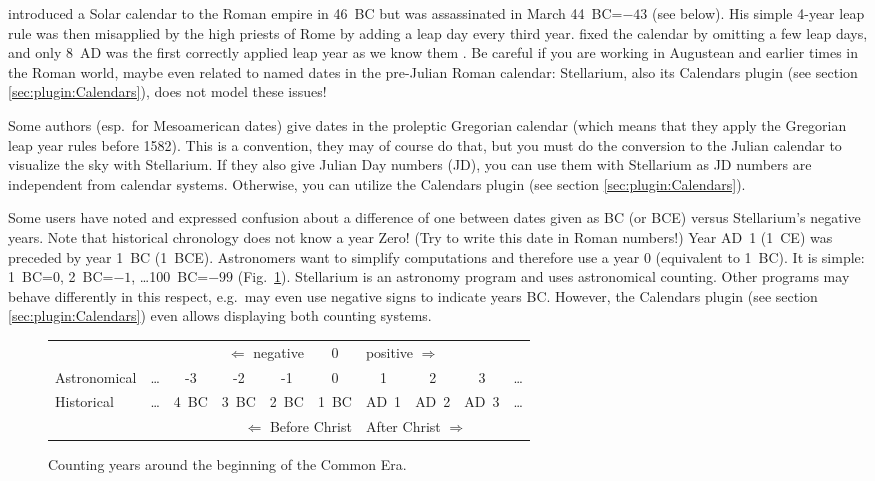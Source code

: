  introduced a Solar calendar to the Roman empire
in 46~BC but was assassinated in March 44~BC=$-43$ (see below).  His
simple 4-year leap rule was then misapplied by the high priests of
Rome by adding a leap day every third year.   fixed the
calendar by omitting a few leap days, and only 8~AD was the first
correctly applied leap year as we know them \citep[\S186,
  \S189]{Ginzel:ChronologieII}. Be careful if you are working in
Augustean and earlier times in the Roman world, maybe even related to
named dates in the pre-Julian Roman calendar: Stellarium, also its
Calendars plugin (see section \ref{sec:plugin:Calendars}), does not
model these issues!


Some authors (esp.\ for Mesoamerican dates) give dates in the
proleptic Gregorian calendar (which means that they apply the Gregorian
leap year rules before 1582). This is a convention, they may of course
do that, but you must do the conversion to the Julian calendar to
visualize the sky with Stellarium.  If they also give Julian Day
numbers (JD), you can use them with Stellarium as JD numbers are
independent from calendar systems. Otherwise, you can utilize the Calendars
plugin (see section \ref{sec:plugin:Calendars}).

Some users have noted and expressed confusion about a difference of one between dates given as BC (or BCE) versus
Stellarium's negative years.  
Note that historical chronology does not know a year Zero! (Try to write this date in Roman numbers!)  
Year AD~1 (1~CE) was preceded by year 1~BC (1~BCE). 
Astronomers want to simplify computations and therefore use a year $0$ (equivalent to 1~BC). 
It is simple: 1~BC=$0$, 2~BC=$-1$, \ldots 100~BC=$-99$ (Fig.~\ref{fig:Accuracy:Calendar}). 
Stellarium is an astronomy program and uses astronomical counting. 
Other programs may behave differently in this respect, 
e.g.\ may even use negative signs to indicate years BC. 
However, the Calendars plugin (see section \ref{sec:plugin:Calendars}) 
even allows displaying both counting systems.

\begin{figure}[htb]\centering\small
  \begin{tabular}{l|ccccccccc}
    & \multicolumn{4}{r}{$\Longleftarrow$ negative}&
    \multicolumn{1}{c}{0}&
    \multicolumn{4}{l}{positive $\Longrightarrow$}\\
    Astronomical & \ldots & -3   & -2   & -1   & 0                        & 1    & 2    & 3    & \ldots\\\hline
    Historical   & \ldots & 4~BC & 3~BC & 2~BC &\multicolumn{1}{c||}{1~BC}& AD~1 & AD~2 & AD~3 & \ldots\\
    & \multicolumn{5}{r||}{$\Longleftarrow$ Before Christ}&
      \multicolumn{4}{l}{After Christ $\Longrightarrow$}
  \end{tabular}
  \caption{Counting years around the beginning of the Common Era.}
  \label{fig:Accuracy:Calendar}
\end{figure}
  

